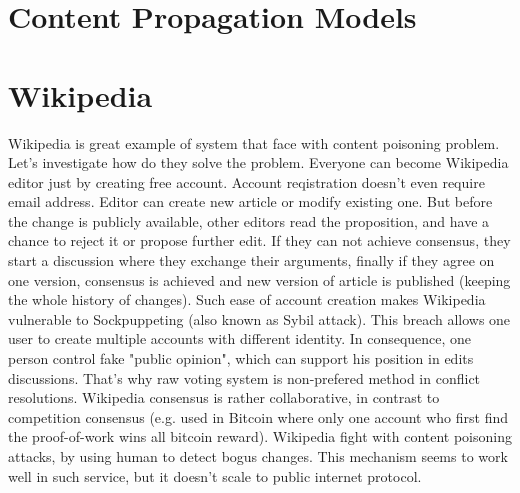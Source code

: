 \documentclass[nostrict]{szablonPG}
\begin{document}
\section{Content Propagation Models}




\section{Wikipedia}
Wikipedia is great example of system that face with content poisoning problem. Let's investigate how do they solve the problem. 
Everyone can become Wikipedia editor just by creating free account. Account reqistration doesn't even require email address. Editor can create new article or modify existing one. But before the change is publicly available, other editors read the proposition, and have a chance to reject it or propose further edit. If they can not achieve consensus, they start a discussion where they exchange their arguments, finally if they agree on one version, consensus is achieved and new version of article is published (keeping the whole history of changes).
Such ease of account creation makes Wikipedia vulnerable to Sockpuppeting (also known as Sybil attack). This breach allows one user to create multiple accounts with different identity. In consequence, one person control fake "public opinion", which can support his position in edits discussions. That's why raw voting system is non-prefered method in conflict resolutions. Wikipedia consensus is rather collaborative, in contrast to competition consensus (e.g. used in Bitcoin where only one account who first find the proof-of-work wins all bitcoin reward). 
Wikipedia fight with content poisoning attacks, by using human to detect bogus changes. This mechanism seems to work well in such service, but it doesn't scale to public internet protocol.
\end{document}
